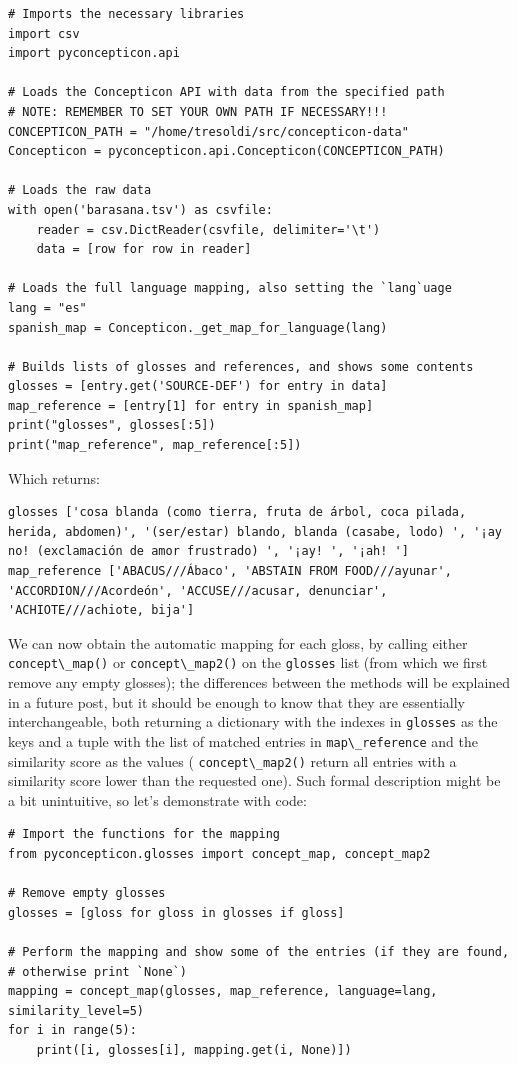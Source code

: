 \documentclass[
  a4paper,
  14pt,
  oneside,
  tablecaptionabove
]{scrbook}
\newcommand{\passthrough}[1]{#1}
\begin{document}
\begin{lstlisting}
# Imports the necessary libraries
import csv
import pyconcepticon.api

# Loads the Concepticon API with data from the specified path
# NOTE: REMEMBER TO SET YOUR OWN PATH IF NECESSARY!!!
CONCEPTICON_PATH = "/home/tresoldi/src/concepticon-data"
Concepticon = pyconcepticon.api.Concepticon(CONCEPTICON_PATH)

# Loads the raw data
with open('barasana.tsv') as csvfile:
    reader = csv.DictReader(csvfile, delimiter='\t')
    data = [row for row in reader]

# Loads the full language mapping, also setting the `lang`uage
lang = "es"
spanish_map = Concepticon._get_map_for_language(lang)

# Builds lists of glosses and references, and shows some contents
glosses = [entry.get('SOURCE-DEF') for entry in data]
map_reference = [entry[1] for entry in spanish_map]
print("glosses", glosses[:5])
print("map_reference", map_reference[:5])
\end{lstlisting}

Which returns:

\begin{lstlisting}
glosses ['cosa blanda (como tierra, fruta de árbol, coca pilada, herida, abdomen)', '(ser/estar) blando, blanda (casabe, lodo) ', '¡ay no! (exclamación de amor frustrado) ', '¡ay! ', '¡ah! ']
map_reference ['ABACUS///Ábaco', 'ABSTAIN FROM FOOD///ayunar', 'ACCORDION///Acordeón', 'ACCUSE///acusar, denunciar', 'ACHIOTE///achiote, bija']
\end{lstlisting}

We can now obtain the automatic mapping for each gloss, by calling
either \passthrough{\lstinline!concept\_map()!} or
\passthrough{\lstinline!concept\_map2()!} on the
\passthrough{\lstinline!glosses!} list (from which we first remove any
empty glosses); the differences between the methods will be explained in
a future post, but it should be enough to know that they are essentially
interchangeable, both returning a dictionary with the indexes in
\passthrough{\lstinline!glosses!} as the keys and a tuple with the list
of matched entries in \passthrough{\lstinline!map\_reference!} and the
similarity score as the values (
\passthrough{\lstinline!concept\_map2()!} return all entries with a
similarity score lower than the requested one). Such formal description
might be a bit unintuitive, so let's demonstrate with code:

\begin{lstlisting}
# Import the functions for the mapping
from pyconcepticon.glosses import concept_map, concept_map2

# Remove empty glosses
glosses = [gloss for gloss in glosses if gloss]

# Perform the mapping and show some of the entries (if they are found,
# otherwise print `None`)
mapping = concept_map(glosses, map_reference, language=lang, similarity_level=5)
for i in range(5):
    print([i, glosses[i], mapping.get(i, None)])
\end{lstlisting}
\end{document}
